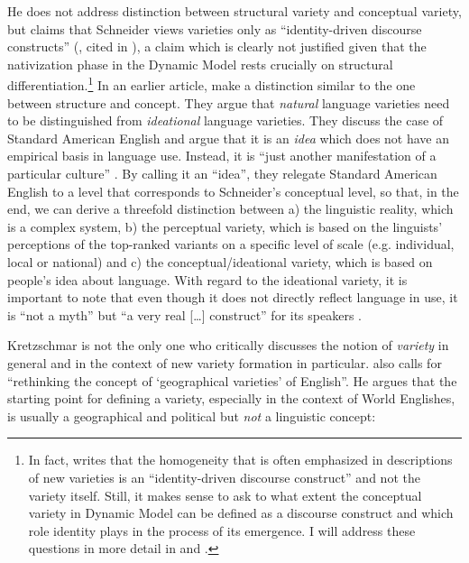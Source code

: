 He does not address  distinction between structural variety and conceptual variety, but claims that Schneider views varieties only as “identity-driven discourse constructs” (\citealt[51]{Schneider2007}, cited in \citealt[157]{Kretzschmar2014}), a claim which is clearly not justified given that the nativization phase in the Dynamic Model rests crucially on structural differentiation.\footnote{In fact, \citet[51]{Schneider2007} writes that the homogeneity that is often emphasized in descriptions of new varieties is an “identity-driven discourse construct” and not the variety itself. Still, it makes sense to ask to what extent the conceptual variety in  Dynamic Model can be defined as a discourse construct and which role identity plays in the process of its emergence. I will address these questions in more detail in  and .} In an earlier article, \citet{Kretzschmar2012} make a distinction similar to the one between structure and concept. They argue that \emph{natural} language varieties need to be distinguished from \emph{ideational} language varieties. They discuss the case of Standard American English and argue that it is an \textit{idea} which does not have an empirical basis in language use. Instead, it is “just another manifestation of a particular culture” \citep[156]{Kretzschmar2012}. By calling it an “idea”, they relegate Standard American English to a level that corresponds to Schneider’s conceptual level, so that, in the end, we can derive a threefold distinction between a) the linguistic reality, which is a complex system, b) the perceptual variety, which is based on the linguists’ perceptions of the top-ranked variants on a specific level of scale (e.g. individual, local or national) and c) the conceptual/ideational variety, which is based on people’s idea about language. With regard to the  ideational variety, it is important to note that even though it does not directly reflect language in use, it is “not a myth” but “a very real […] construct” for its speakers \citep[143]{Kretzschmar2012}.


Kretzschmar is not the only one who critically discusses the notion of \textit{variety} in general and in the context of new variety formation in particular. \citet{Leimgruber2013b} also calls for “rethinking the concept of ‘geographical varieties’ of English”. He argues that the starting point for defining a variety, especially in the context of World Englishes, is usually a geographical and political but \emph{not} a linguistic concept:

